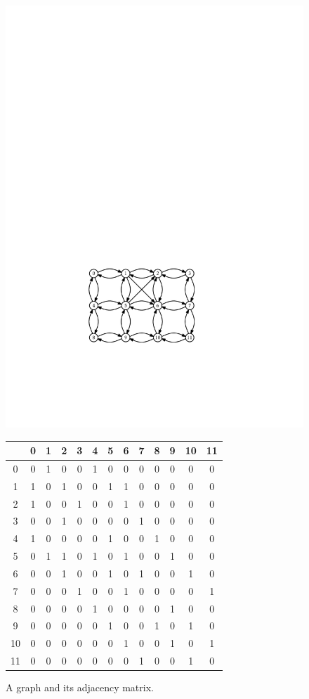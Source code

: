 \begin{figure}
	\begin{center}
		\includegraphics[scale=0.90909]{figs/graph} \\[3ex]
		\begin{tabular}{c|cccccccccccc}
			&0&1&2&3&4&5&6&7&8&9&10&11 \\\hline
			0&0&1&0&0&1&0&0&0&0&0&0 &0\\
			1&1&0&1&0&0&1&1&0&0&0&0 &0\\
			2&1&0&0&1&0&0&1&0&0&0&0 &0\\
			3&0&0&1&0&0&0&0&1&0&0&0 &0\\
			4&1&0&0&0&0&1&0&0&1&0&0 &0\\
			5&0&1&1&0&1&0&1&0&0&1&0 &0\\
			6&0&0&1&0&0&1&0&1&0&0&1 &0\\
			7&0&0&0&1&0&0&1&0&0&0&0 &1\\
			8&0&0&0&0&1&0&0&0&0&1&0 &0\\
			9&0&0&0&0&0&1&0&0&1&0&1 &0\\
			10&0&0&0&0&0&0&1&0&0&1&0 &1\\
			11&0&0&0&0&0&0&0&1&0&0&1 &0\\
		\end{tabular} 
	\end{center}
	\caption{A graph and its adjacency matrix.}
\end{figure}

